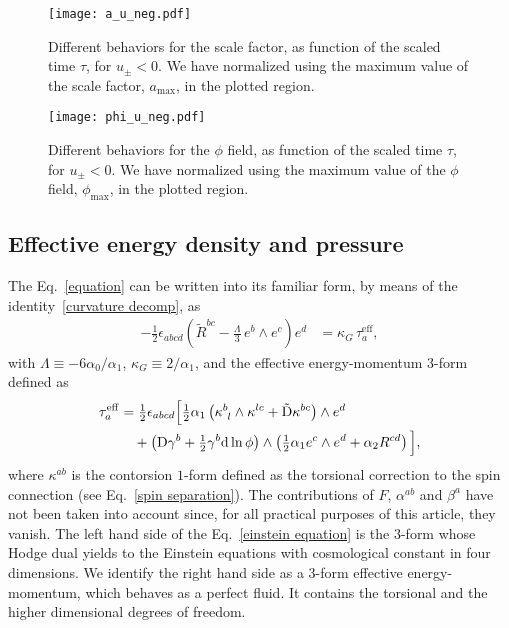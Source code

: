 \documentclass[aps,prd,12pt,superscriptaddress,showpacs,showkeys,longbibliography,reprint,nofootinbib]{revtex4-1}
\begin{document}
\begin{figure}[H]
  \texttt{[image: a\_u\_neg.pdf]}
  \caption{Different behaviors for the scale factor, as function of the scaled time $\tau$, for $u_\pm < 0$. We have normalized using the maximum value of the scale factor, $a_{\mathrm{max}}$, in the plotted region.}
  \label{a_u_neg}
\end{figure}

\begin{figure}[H]
  \texttt{[image: phi\_u\_neg.pdf]}
  \caption{Different behaviors for the $\phi$ field, as function of the scaled time $\tau$, for $u_\pm < 0$. We have normalized using the maximum value of the $\phi$ field, $\phi_{\mathrm{max}}$, in the plotted region.}
  \label{phi_u_neg}
\end{figure}


\subsection{Effective energy density and pressure}

The Eq.~\eqref{equation} can be written into its familiar form, by means of the identity~\eqref{curvature decomp}, as
\begin{align}\label{einstein equation}
  -\frac{1}{2}\epsilon_{abcd}\left(\tilde{R}^{bc} - \frac{\Lambda}{3}\,e^b\wedge e^c\right)e^d &= \kappa_{G}\,\tau^{\mathrm{eff}}_a,
\end{align}
with $\Lambda \equiv -6\alpha_0/\alpha_1$, $\kappa_{G} \equiv 2/\alpha_1$, and the effective energy-momentum $3$-form defined as
\begin{align}
  \label{taua}
  \tau_a^{\mathrm{eff}}&= \tfrac{1}{2}\epsilon_{abcd}\Big[\tfrac{1}{2}\alpha_1\left(\kappa^b_{\ l}\wedge\kappa^{lc}+\tilde{\text{D}}\kappa^{bc}\right)\wedge e^d\\
    & \quad +\left(\text{D}\gamma^b+\tfrac{1}{2}\gamma^b\text{d}\ln\phi\right)\wedge\left(\tfrac{1}{2}\alpha_1e^c\wedge e^d+\alpha_2R^{cd}\right)\Big], \notag
\end{align}
where $\kappa^{ab}$ is the contorsion $1$-form defined as the torsional correction to the spin connection (see Eq.~\eqref{spin separation}).
The contributions of $F$, $\alpha^{ab}$ and $\beta^a$ have not been taken into account since, for all practical purposes of this article, they vanish.
The left hand side of the Eq.~\eqref{einstein equation} is the $3$-form whose Hodge dual yields to the Einstein equations with cosmological constant in four dimensions.
We identify the right hand side as a $3$-form effective energy-momentum, which behaves as a perfect fluid. It contains the torsional and the higher dimensional degrees of freedom.
\end{document}
